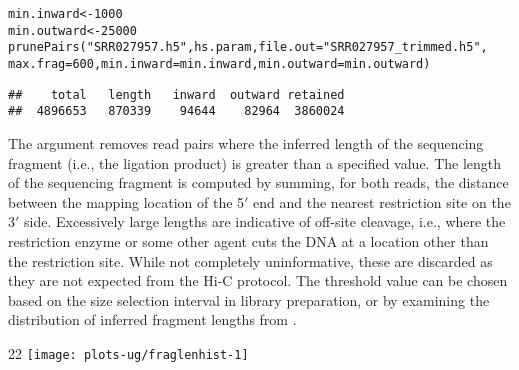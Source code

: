\documentclass{report}\usepackage[]{graphicx}\usepackage[usenames,dvipsnames]{color}
\makeatletter
\def\maxwidth{ %
  \ifdim\Gin@nat@width>\linewidth
    \linewidth
  \else
    \Gin@nat@width
  \fi
}
\newcommand{\hlnum}[1]{\textcolor[rgb]{0.816,0.125,0.439}{#1}}%
\newcommand{\hlstr}[1]{\textcolor[rgb]{0.251,0.627,0.251}{#1}}%
\newcommand{\hlopt}[1]{\textcolor[rgb]{0,0,0}{#1}}%
\newcommand{\hlstd}[1]{\textcolor[rgb]{0.251,0.251,0.251}{#1}}%
\newcommand{\hlkwb}[1]{\textcolor[rgb]{0,0,0}{#1}}%
\newcommand{\hlkwc}[1]{\textcolor[rgb]{0.251,0.251,0.251}{#1}}%
\newcommand{\hlkwd}[1]{\textcolor[rgb]{0.878,0.439,0.125}{#1}}%
\newenvironment{knitrout}{}{} %
\makeatother
\begin{document}
\begin{knitrout}
\color{fgcolor}\begin{kframe}
\begin{alltt}
\hlstd{min.inward} \hlkwb{<-} \hlnum{1000}
\hlstd{min.outward} \hlkwb{<-} \hlnum{25000}
\hlkwd{prunePairs}\hlstd{(}\hlstr{"SRR027957.h5"}\hlstd{, hs.param,} \hlkwc{file.out}\hlstd{=}\hlstr{"SRR027957_trimmed.h5"}\hlstd{,}
           \hlkwc{max.frag}\hlstd{=}\hlnum{600}\hlstd{,} \hlkwc{min.inward}\hlstd{=min.inward,} \hlkwc{min.outward}\hlstd{=min.outward)}
\end{alltt}
\begin{verbatim}
##    total   length   inward  outward retained 
##  4896653   870339    94644    82964  3860024
\end{verbatim}
\end{kframe}
\end{knitrout}

The  argument removes read pairs where the inferred length of the sequencing fragment (i.e., the ligation product) is greater than a specified value.
The length of the sequencing fragment is computed by summing, for both reads, the distance between the mapping location of the 5$'$ end and the nearest restriction site on the 3$'$ side.
Excessively large lengths are indicative of off-site cleavage, i.e., where the restriction enzyme or some other agent cuts the DNA at a location other than the restriction site.
While not completely uninformative, these are discarded as they are not expected from the Hi-C protocol.
The threshold value can be chosen based on the size selection interval in library preparation, or by examining the distribution of inferred fragment lengths from .

\begin{knitrout}
\color{fgcolor}\begin{adjustwidth}{2\fltoffset}{2\fltoffset}
\texttt{[image: plots-ug/fraglenhist-1]} \end{adjustwidth}
\end{knitrout}
\end{document}
